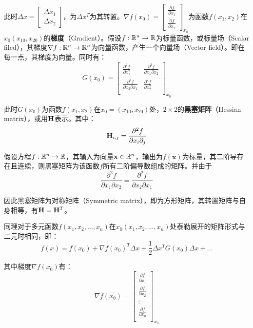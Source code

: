 \documentclass[11pt]{article}
\begin{document}
\begin{appendices}
此时$\Delta x = \begin{bmatrix} \Delta x_1\\ \Delta x_2 \end{bmatrix}$，为$\Delta x^{T}$为其转置。$\nabla f(x_0) = \begin{bmatrix} \frac{\partial f}{\partial x_1} \\ \frac{\partial f}{\partial x_2} \end{bmatrix}_{x_0}$为函数$f(x_1,x_2)$在$x_0(x_{10},x_{20})$的\textbf{梯度}（Gradient）。假设$f:\mathbb{R}^n \rightarrow \mathbb{R}$为标量函数，或标量场（Scalar filed），其梯度$\nabla f:\mathbb{R}^n \rightarrow \mathbb{R}^n$为向量函数，产生一个向量场（Vector field）。即在每一点，其梯度为向量。同时有：
\begin{equation*}
    G(x_0) =
    \begin{bmatrix}
        \frac{\partial^2 f}{\partial x_1^2} & \frac{\partial^2 f}{\partial x_1 \partial x_2} \\
        \frac{\partial^2 f}{\partial x_2 \partial x_1} & \frac{\partial^2 f}{\partial x_2^2} \\
    \end{bmatrix}_{x_0}
\end{equation*}

此时$G(x_0)$为函数$f(x_1,x_2)$在$x_0=(x_{10},x_{20})$处，$2\times 2$的\textbf{黑塞矩阵}（Hessian matrix），或用$\mathbf{H}$表示。其中：
\begin{equation*}
    \mathbf{H}_{i,j} = \frac{\partial^2 f}{\partial x_i \partial_j}
\end{equation*}

假设方程$f:\mathbb{R}^n \rightarrow \mathbb{R}$，其输入为向量$\mathbf{x}\in \mathbb{R}^n$，输出为$f(\bm{x})$为标量，其二阶导存在且连续，则黑塞矩阵为该函数$f$所有二阶偏导数组成的矩阵。并由于
\begin{equation*}
    \frac{\partial^2 f}{\partial x_1 \partial x_2}
    = \frac{\partial^2 f}{\partial x_2 \partial x_1}
\end{equation*}

因此黑塞矩阵为对称矩阵（Symmetric matrix），即为方形矩阵，其转置矩阵与自身相等，有$\mathbf{H} = \mathbf{H}^{T}$。

同理对于多元函数$f(x_1,x_2,\dots,x_n)$在$x_0(x_1,x_2,\dots,x_n)$处泰勒展开的矩阵形式与二元时相同，即：
\begin{equation*}
    f(x) = f(x_0) + \nabla f(x_0)^{T}\Delta x + \frac{1}{2}\Delta x^{T} G(x_0) \Delta x + \dots
\end{equation*}

其中梯度$\nabla f(x_0)$有：
\begin{equation*}
    \nabla f(x_0) = 
    \begin{bmatrix}
        \frac{\partial f}{\partial x_1} \\
        \frac{\partial f}{\partial x_2} \\
        \vdots \\
        \frac{\partial f}{\partial x_n} \\
    \end{bmatrix}_{x_0}
\end{equation*}


\end{appendices}
\end{document}
